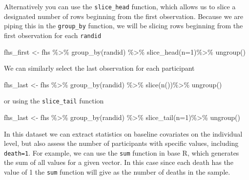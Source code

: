 \documentclass[
]{book}
\newenvironment{Shaded}{\begin{snugshade}}{\end{snugshade}}
\newcommand{\AttributeTok}[1]{\textcolor[rgb]{0.77,0.63,0.00}{#1}}
\newcommand{\DecValTok}[1]{\textcolor[rgb]{0.00,0.00,0.81}{#1}}
\newcommand{\FunctionTok}[1]{\textcolor[rgb]{0.00,0.00,0.00}{#1}}
\newcommand{\NormalTok}[1]{#1}
\newcommand{\OtherTok}[1]{\textcolor[rgb]{0.56,0.35,0.01}{#1}}
\newcommand{\SpecialCharTok}[1]{\textcolor[rgb]{0.00,0.00,0.00}{#1}}
\begin{document}
Alternatively you can use the \texttt{slice\_head} function, which allows us to slice a designated number of rows beginning from the first observation. Because we are piping this in the \texttt{group\_by} function, we will be slicing rows beginning from the first observation for each \texttt{randid}

\begin{Shaded}
\begin{Highlighting}[]
\NormalTok{fhs\_first }\OtherTok{\textless{}{-}}\NormalTok{ fhs }\SpecialCharTok{\%\textgreater{}\%} 
  \FunctionTok{group\_by}\NormalTok{(randid) }\SpecialCharTok{\%\textgreater{}\%} 
  \FunctionTok{slice\_head}\NormalTok{(}\AttributeTok{n=}\DecValTok{1}\NormalTok{)}\SpecialCharTok{\%\textgreater{}\%} 
\FunctionTok{ungroup}\NormalTok{()}
\end{Highlighting}
\end{Shaded}

We can similarly select the last observation for each participant

\begin{Shaded}
\begin{Highlighting}[]
\NormalTok{fhs\_last }\OtherTok{\textless{}{-}}\NormalTok{ fhs }\SpecialCharTok{\%\textgreater{}\%} 
  \FunctionTok{group\_by}\NormalTok{(randid) }\SpecialCharTok{\%\textgreater{}\%} 
  \FunctionTok{slice}\NormalTok{(}\FunctionTok{n}\NormalTok{())}\SpecialCharTok{\%\textgreater{}\%} 
\FunctionTok{ungroup}\NormalTok{()}
\end{Highlighting}
\end{Shaded}

or using the \texttt{slice\_tail} function

\begin{Shaded}
\begin{Highlighting}[]
\NormalTok{fhs\_last }\OtherTok{\textless{}{-}}\NormalTok{ fhs }\SpecialCharTok{\%\textgreater{}\%} 
  \FunctionTok{group\_by}\NormalTok{(randid) }\SpecialCharTok{\%\textgreater{}\%} 
  \FunctionTok{slice\_tail}\NormalTok{(}\AttributeTok{n=}\DecValTok{1}\NormalTok{)}\SpecialCharTok{\%\textgreater{}\%} 
\FunctionTok{ungroup}\NormalTok{()}
\end{Highlighting}
\end{Shaded}

In this dataset we can extract statistics on baseline covariates on the individual level, but also assess the number of participants with specific values, including \texttt{death=1}. For example, we can use the \texttt{sum} function in base R, which generates the sum of all values for a given vector. In this case since each death has the value of 1 the \texttt{sum} function will give as the number of deaths in the sample.
\end{document}
